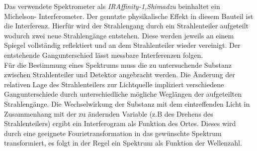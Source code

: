 Das verwendete Spektrometer als \textit{IRAffinity-1,Shimadzu} beinhaltet ein Michelson- Interferometer. Der genutzte physikalische Effekt in diesem Bauteil ist die Interferenz. Hierfür wird der Strahlengang durch ein Strahlenteiler aufgeteilt wodurch zwei neue Strahlengänge entstehen. Diese werden jeweils an einem Spiegel vollständig reflektiert und an dem Strahlenteiler wieder vereinigt. Der entstehende Gangunterschied lässt messbare Interferenzen folgen. \\
Für die Bestimmung eines Spektrums muss die zu untersuchende Substanz zwischen Strahlenteiler und Detektor angebracht werden. Die Änderung der relativen Lage des Strahlenteilers zur Lichtquelle impliziert verschiedene Gangunterschiede durch unterschiedliche mögliche Weglängen der aufgeteilten Strahlengänge. Die Wechselwirkung der Substanz mit dem eintreffenden Licht in Zusammenhang mit der zu ändernden Variable (z.B des Drehens des Strahlenteilers) ergibt ein Interferogram als Funktion des Ortes. Dieses wird durch eine geeignete Fourietransformation in das gewünschte Spektrum transformiert, es folgt in der Regel ein Spektrum als Funktion der Wellenzahl. 
\newpage
%